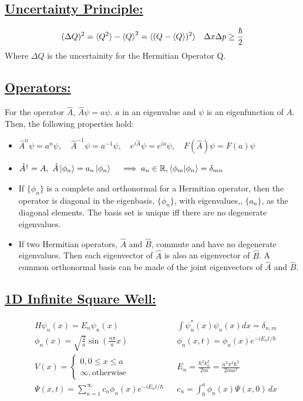 \documentclass[a4paper,12pt]{article}
\begin{document}
\subsection*{\underline{Uncertainty Principle:}}
\begin{align}
    &(\Delta Q)^2 = \braket{Q^2} - \braket{Q}^2 = \braket{(Q-\braket{Q})^2}
    &\Delta x \Delta p \geq \frac{\hbar}{2}
\end{align}
Where $\Delta Q$ is the uncertainity for the Hermitian Operator Q.
\subsection*{\underline{Operators:}}
For the operator $\hat{A}$, $\hat{A}\psi=a\psi$. $a$ in an eigenvalue and $\psi$ is an eigenfunction of $A$. Then, the following properties hold:
\begin{itemize}
    \item $\hat{A}^n\psi=a^n\psi,\quad \hat{A}^{-1}\psi=a^{-1}\psi,\quad e^{i\hat{A}}\psi=e^{ia}\psi,\quad F(\hat{A})\psi=F(a)\psi$
    \item $\hat{A}^{\dagger}=A,\ \hat{A}\ket{\phi_n}=a_n\ket{\phi_n} \quad \implies a_n\in \mathbb{R}, \braket{\phi_m|\phi_n}=\delta_{mn}$
    \item If $\{\phi_n\}$ is a complete and orthonormal for a Hermitian operator, then the operator is diagonal in the eigenbasis, $\{\phi_n\}$, with eigenvalues,, $\{a_n\}$, as the diagonal elements. The basis set is unique iff there are no degenerate eigenvalues.
    \item If two Hermitian operators, $\hat{A}$ and $\hat{B}$, commute and have no degenerate eigenvalues. Then each eigenvector of $\hat{A}$ is also an eigenvector of $\hat{B}$. A common orthonormal basis can be made of the joint eigenvectors of $\hat{A}$ and $\hat{B}$.
\end{itemize}
\subsection*{\underline{1D Infinite Square Well:}}
\begin{align}
    &H\psi_n(x)=E_n\psi_n(x)
    &
    &\int\psi^*_n(x)\psi_n(x)dx=\delta_{n,m}
    \\
    &\phi_n(x)=\sqrt{\frac{2}{a}}\sin\left( \frac{n\pi}{a}x \right)
    &
    &\phi_n(x,t)=\phi_n(x)e^{-iE_nt/\hbar}
    \\
    &V(x)=\left\{\begin{matrix}0, 0\leq x\leq a\\\infty, \mathrm{otherwise}\end{matrix}\right.
    &
    &E_n=\frac{\hbar^2k_n^2}{2m}=\frac{n^2\pi^2\hbar^2}{2ma^2}
    \\
    &\Psi(x,t)=\sum_{n=1}^\infty c_n\phi_n(x)e^{-iE_nt/\hbar}
    &
    &c_n=\int_0^a\phi_n(x)\Psi(x,0)\,dx
\end{align}
\end{document}

